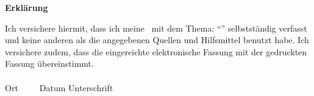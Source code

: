 \newpage
\thispagestyle{empty}
\begin{framed}
  \begin{center}
    \Large\bfseries Erklärung
  \end{center}
  Ich versichere hiermit, dass ich meine \Was\ mit dem Thema:
  \enquote{\Titel}
  selbstständig verfasst und keine anderen als die angegebenen Quellen und Hilfsmittel benutzt habe.
  Ich versichere zudem, dass die eingereichte elektronische Fassung mit der gedruckten Fassung übereinstimmt.\\[3cm]
  \underline{\hspace{4cm}} \hfill \underline{\hspace{6cm}}\\[0.2cm]
  Ort~~~~~Datum \hfill Unterschrift \hspace{3.7cm}
\end{framed}